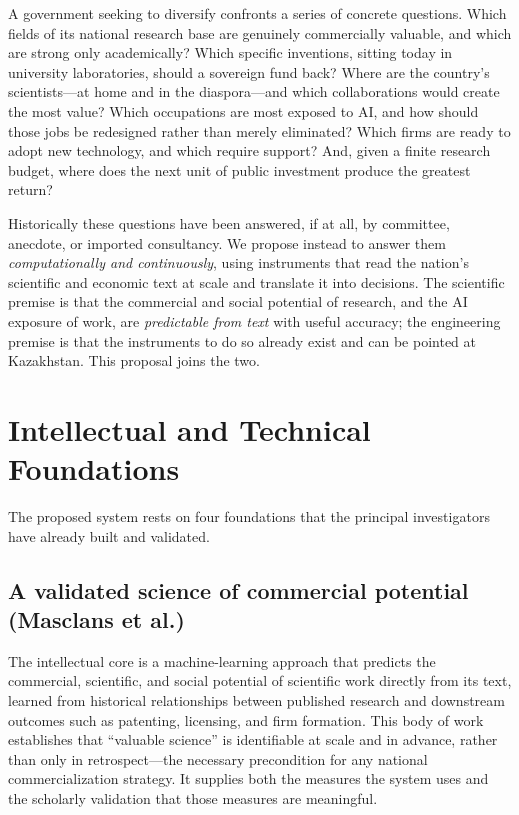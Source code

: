 \documentclass[11pt]{article}
\begin{document}
A government seeking to diversify confronts a series of concrete questions.
Which fields of its national research base are genuinely commercially valuable,
and which are strong only academically? Which specific inventions, sitting today
in university laboratories, should a sovereign fund back? Where are the country's
scientists---at home and in the diaspora---and which collaborations would create
the most value? Which occupations are most exposed to AI, and how should those
jobs be redesigned rather than merely eliminated? Which firms are ready to adopt
new technology, and which require support? And, given a finite research budget,
where does the next unit of public investment produce the greatest return?

Historically these questions have been answered, if at all, by committee,
anecdote, or imported consultancy. We propose instead to answer them
\emph{computationally and continuously}, using instruments that read the
nation's scientific and economic text at scale and translate it into decisions.
The scientific premise is that the commercial and social potential of research,
and the AI exposure of work, are \emph{predictable from text} with useful
accuracy; the engineering premise is that the instruments to do so already
exist and can be pointed at Kazakhstan. This proposal joins the two.

\section{Intellectual and Technical Foundations}

The proposed system rests on four foundations that the principal investigators
have already built and validated.

\subsection{A validated science of commercial potential (Masclans et al.)}
The intellectual core is a machine-learning approach that predicts the
commercial, scientific, and social potential of scientific work directly from
its text, learned from historical relationships between published research and
downstream outcomes such as patenting, licensing, and firm formation. This body
of work establishes that ``valuable science'' is identifiable at scale and in
advance, rather than only in retrospect---the necessary precondition for any
national commercialization strategy. It supplies both the measures the system
uses and the scholarly validation that those measures are meaningful.
\end{document}
